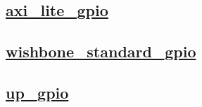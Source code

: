 \documentclass{article}
\begin{document}
  


  \subsection{\href{../files/axi_lite_gpio-v.html}{axi\_lite\_gpio}}

  \subsection{\href{../files/wishbone_standard_gpio-v.html}{wishbone\_standard\_gpio}}

  \subsection{\href{../files/up_gpio-v.html}{up\_gpio}}
\end{document}
